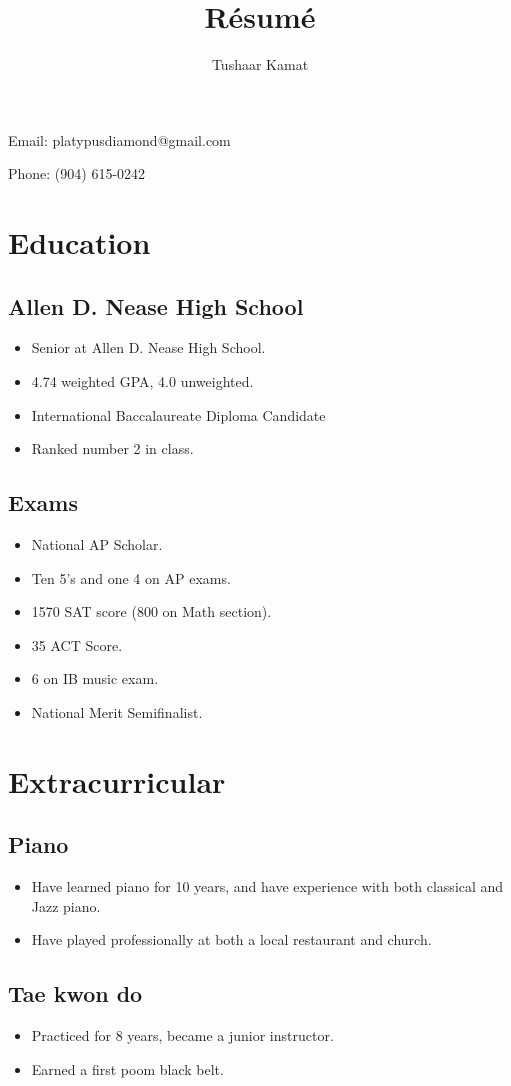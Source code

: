 \documentclass[12pt]{article}
\author{Tushaar Kamat}
\title{R\'esum\'e}
\makeatletter
\renewcommand{\maketitle}{
  \begin{center}
  \begin{Huge}
    \theauthor
  \end{Huge}

  Email: platypusdiamond@gmail.com

  Phone: (904) 615-0242
  \end{center}
}
\makeatother
\begin{document}
\maketitle

\section{Education} 
\subsection{Allen D. Nease High School}
\begin{itemize}
\item Senior at Allen D. Nease High School.
\item 4.74 weighted GPA, 4.0 unweighted. 
\item International Baccalaureate Diploma Candidate
\item Ranked number 2 in class. 
\end{itemize}
\subsection{Exams}
\begin{itemize}
\item National AP Scholar.
\item Ten 5's and one 4 on AP exams.
\item 1570 SAT score (800 on Math section).
\item 35 ACT Score.
\item 6 on IB music exam.
\item National Merit Semifinalist.
\end{itemize}

\section{Extracurricular}
\subsection{Piano}
\begin{itemize}
\item Have learned piano for 10 years, and have experience with both classical
  and Jazz piano.
\item Have played professionally at both a local restaurant and church.
\end{itemize}
\subsection{Tae kwon do}
\begin{itemize}
\item Practiced for 8 years, became a junior instructor. 
\item Earned a first poom black belt.

\end{itemize}
\end{document}

